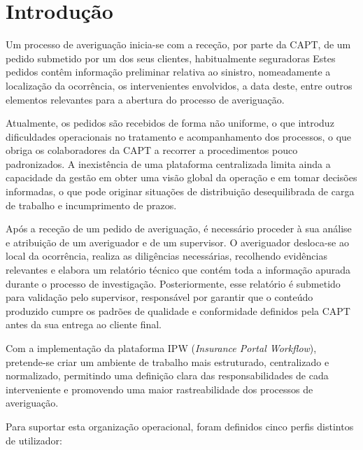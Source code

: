 ﻿%
%
\chapter{Introdução} \label{cap:intro}
Um processo de averiguação inicia-se com a receção, por parte da CAPT, de um pedido submetido por um dos seus clientes, habitualmente seguradoras Estes pedidos contêm informação preliminar relativa ao sinistro, nomeadamente a localização da ocorrência, os intervenientes envolvidos, a data deste, entre outros elementos relevantes para a abertura do processo de averiguação.

Atualmente, os pedidos são recebidos de forma não uniforme, o que introduz dificuldades operacionais no tratamento e acompanhamento dos processos, o que obriga os colaboradores da CAPT a recorrer a procedimentos pouco padronizados. A inexistência de uma plataforma centralizada limita ainda a capacidade da gestão em obter uma visão global da operação e em tomar decisões informadas, o que pode originar situações de distribuição desequilibrada de carga de trabalho e incumprimento de prazos.

Após a receção de um pedido de averiguação, é necessário proceder à sua análise e atribuição de um averiguador e de um supervisor. O averiguador desloca-se ao local da ocorrência, realiza as diligências necessárias, recolhendo evidências relevantes e elabora um relatório técnico que contém toda a informação apurada durante o processo de investigação. Posteriormente, esse relatório é submetido para validação pelo supervisor, responsável por garantir que o conteúdo produzido cumpre os padrões de qualidade e conformidade definidos pela CAPT antes da sua entrega ao cliente final.

Com a implementação da plataforma IPW (\textit{Insurance Portal Workflow}), pretende-se criar um ambiente de trabalho mais estruturado, centralizado e normalizado, permitindo uma definição clara das responsabilidades de cada interveniente e promovendo uma maior rastreabilidade dos processos de averiguação.

Para suportar esta organização operacional, foram definidos cinco perfis distintos de utilizador:

